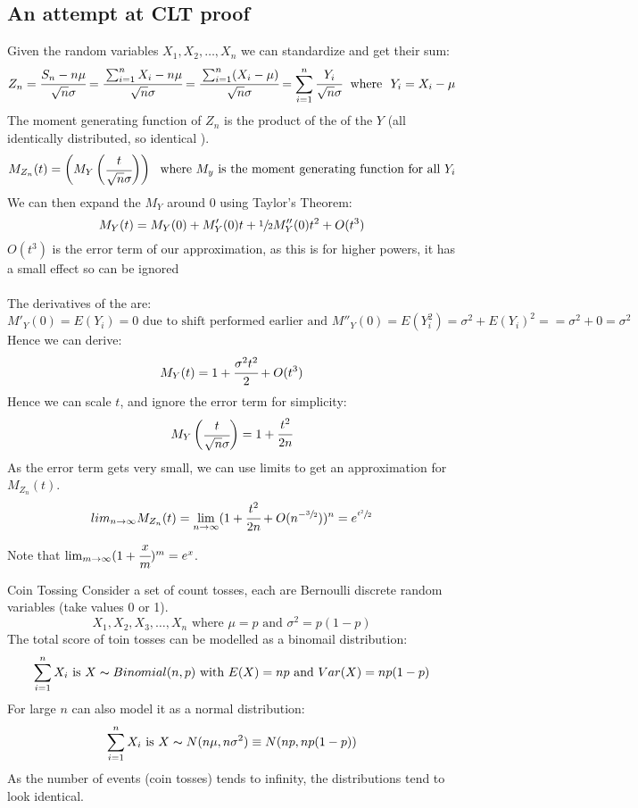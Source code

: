 \subsection{An attempt at CLT proof}
Given the random variables $X_1, X_2, \dots, X_n$ we can standardize and get their sum:
\[Z_n = \cfrac{S_n - n \mu}{\sqrt{n} \sigma} = \cfrac{\sum_{i=1}^nX_i - n\mu}{\sqrt{n} \sigma} = \cfrac{\sum_{i=1}^n(X_i - \mu)}{\sqrt{n} \sigma} = \sum_{i=1}^n \cfrac{Y_i}{\sqrt{n}\sigma} \ \text{ where } \ Y_i = X_i - \mu\]
The moment generating function of $Z_n$ is the product of the  of the $Y$ (all identically distributed, so identical ).
\[M_{Z_n}(t) = \begin{pmatrix}
		M_Y \begin{pmatrix}
			\cfrac{t}{\sqrt{n}\sigma}
		\end{pmatrix}
	\end{pmatrix} \ \text{ where } M_y \text{ is the moment generating function for all } Y_i\]
We can then expand the $M_Y$ around 0 using Taylor's Theorem:
\[M_Y(t) = M_Y(0) + M'_Y(0)t + \sfrac{1}{2}M''_Y(0)t^2 + O(t^3)\]
$O(t^3)$ is the error term of our approximation, as this is for higher powers, it has a small effect so can be ignored
\\
\\ The derivatives of the  are:
\[M'_Y(0) = E(Y_i) = 0 \text{ due to shift performed earlier and } M''_Y(0) = E(Y_i^2) = \sigma^2 + E(Y_i)^2 = = \sigma^2 + 0 = \sigma^2\]
Hence we can derive:
\[M_Y(t) = 1 + \cfrac{\sigma^2t^2}{2} + O(t^3)\]
Hence we can scale $t$, and ignore the error term for simplicity:
\[M_Y \begin{pmatrix}
		\cfrac{t}{\sqrt{n}\sigma}
	\end{pmatrix} = 1 + \cfrac{t^2}{2n}\]
As the error term gets very small, we can use limits to get an approximation for $M_{Z_n}(t)$.
\[lim_{n \to \infty} M_{Z_n}(t) = \lim_{n \to \infty}(1 + \cfrac{t^2}{2n} + O(n^{-\sfrac{3}{2}}))^n = e^{\sfrac{t^2}{2}}\]
Note that $\lim_{m \to \infty}(1 + \cfrac{x}{m})^m = e^x$.
\begin{examplebox}{Coin Tossing}
	Consider a set of count tosses, each are Bernoulli discrete random variables (take values 0 or 1).
	\[X_1, X_2, X_3, \dots, X_n \text{ where } \mu = p \text{ and } \sigma^2 = p(1-p)\]
	The total score of toin tosses can be modelled as a binomail distribution:
	\[\sum_{i=1}^nX_i \text{ is } X \thicksim Binomial(n,p) \text{ with } E(X) = np \text{ and } Var(X) = np(1-p)\]
	For large $n$ can also model it as a normal distribution:
	\[\sum_{i=1}^nX_i \text{ is } X \thicksim N(n \mu, n \sigma^2) \equiv N(np, n p(1-p)) \]
	As the number of events (coin tosses) tends to infinity, the distributions tend to look identical.
\end{examplebox}
